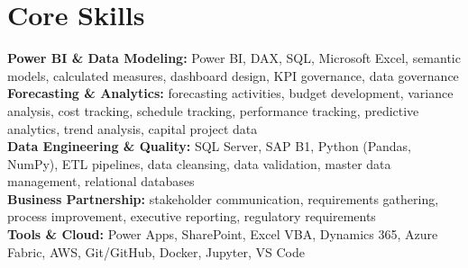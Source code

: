 \documentclass[10.5pt,letterpaper]{article}
\begin{document}
\section{Core Skills}
\noindent
\textbf{Power BI \& Data Modeling:} Power BI, DAX, SQL, Microsoft Excel, semantic models, calculated measures, dashboard design, KPI governance, data governance\\\textbf{Forecasting \& Analytics:} forecasting activities, budget development, variance analysis, cost tracking, schedule tracking, performance tracking, predictive analytics, trend analysis, capital project data\\\textbf{Data Engineering \& Quality:} SQL Server, SAP B1, Python (Pandas, NumPy), ETL pipelines, data cleansing, data validation, master data management, relational databases\\\textbf{Business Partnership:} stakeholder communication, requirements gathering, process improvement, executive reporting, regulatory requirements\\\textbf{Tools \& Cloud:} Power Apps, SharePoint, Excel VBA, Dynamics 365, Azure Fabric, AWS, Git/GitHub, Docker, Jupyter, VS Code
\end{document}
